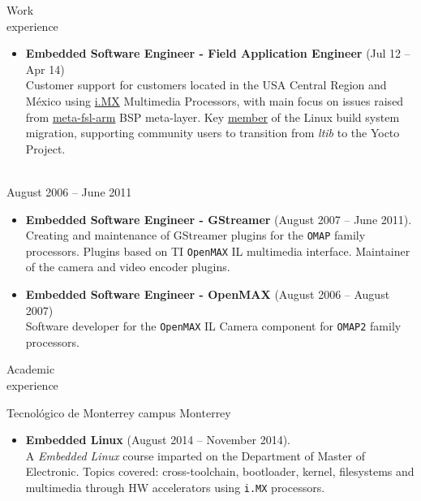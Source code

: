 \documentclass{resume}
\def\itesm{Tecnol\'ogico de Monterrey campus Monterrey}
\begin{document}
\begin{category}{Work \\experience}
\begin{itemize}
\item \textbf{Embedded Software Engineer - Field Application Engineer} (Jul 12 -- Apr 14)\\
  Customer support for customers located in the USA Central Region and M\'exico using
  \href{https://www.nxp.com/products/processors-and-microcontrollers/arm-processors/i-mx-applications-processors:IMX_HOME}{i.MX}
  Multimedia Processors, with main focus on issues raised from \href{https://git.yoctoproject.org/cgit/cgit.cgi/meta-fsl-arm}{meta-fsl-arm} BSP meta-layer.
  Key \href{https://community.nxp.com/t5/user/viewprofilepage/user-id/25586}{member}
  of the Linux build system migration, supporting community users to transition from \textit{ltib} to the Yocto Project.
\end{itemize}

\\
August 2006 -- June 2011

\begin{itemize}
\item \textbf{Embedded Software Engineer - GStreamer} (August 2007 -- June 2011).\\
  Creating and maintenance of GStreamer plugins for the \texttt{OMAP} family
  processors. Plugins based on TI \texttt{OpenMAX} IL multimedia interface.
  Maintainer of the camera and video encoder plugins.

\item \textbf{Embedded Software Engineer  - OpenMAX} (August 2006 -- August 2007)\\
  Software developer for the \texttt{OpenMAX} IL Camera component for
  \texttt{OMAP2} family processors.
\end{itemize}
\end{category}

\begin{category}{Academic \\experience}

\citem\itesm\\
\begin{itemize}
\item \textbf{Embedded Linux} (August 2014 -- November 2014).\\
  A \textit{Embedded Linux} course imparted on the Department of
  Master of Electronic. Topics covered: cross-toolchain, bootloader,
  kernel, filesystems and multimedia through HW accelerators using
  \texttt{i.MX} processors.
\end{itemize}
\end{category}
\end{document}
